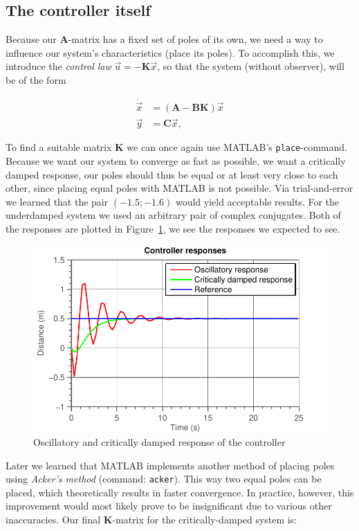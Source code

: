\documentclass[11pt,titlepage]{report}
\begin{document}
\subsection{The controller itself}
Because our $\mathbf{A}$-matrix has a fixed set of poles of its own, we need a way to influence our system's characteristics (place its poles). To accomplish this, we introduce the \textit{control law} $\vec{u} = -\mathbf{K}\vec{x}$, so that the system (without observer), will be of the form

\begin{equation*}
	\begin{split}
		\dot{\vec{x}} &= (\mathbf{A}-\mathbf{B}\mathbf{K})\vec{x} \\
		\vec{y} &= \mathbf{C}\vec{x},
	\end{split}
\end{equation*}

To find a suitable matrix $\mathbf{K}$ we can once again use MATLAB's \texttt{place}-command.
Because we want our system to converge as fast as possible, we want a critically damped response, our poles should thus be equal or at least very close to each other, since placing equal poles with MATLAB is not possible. Via trial-and-error we learned that the pair $(-1.5; -1.6)$ would yield acceptable results.
For the underdamped system we used an arbitrary pair of complex conjugates. Both of the responses are plotted in Figure~\ref{fig:ass2-controller-response}, we see the responses we expected to see.

\begin{figure}[H]
	\begin{center}
		\includegraphics[width=0.7\linewidth]{resource/controller.pdf}
	\end{center}
	\caption{Oscillatory and critically damped response of the controller}
	\label{fig:ass2-controller-response}
\end{figure}

Later we learned that MATLAB implements another method of placing poles using \textit{Acker's method} (command: \texttt{acker}). This way two equal poles can be placed, which theoretically results in faster convergence. In practice, however, this improvement would most likely prove to be insignificant due to various other inaccuracies. Our final $\mathbf{K}$-matrix for the critically-damped system is:
\end{document}
